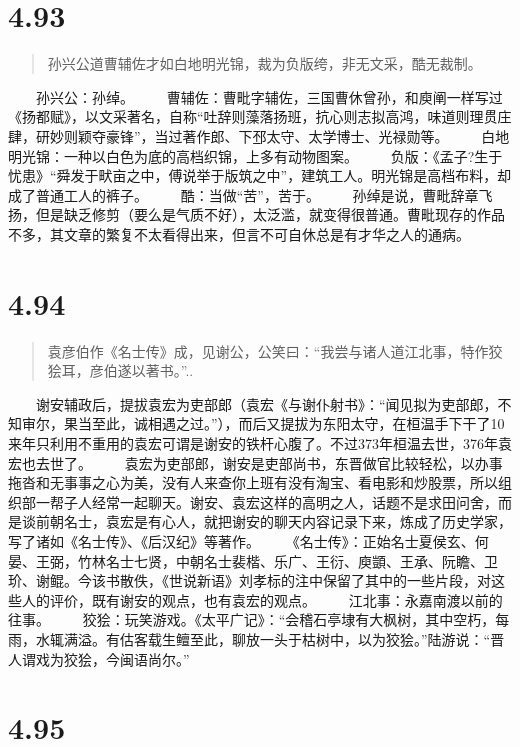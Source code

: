 \documentclass[]{book}
\begin{document}
\section{4.93}\label{section-269}

\begin{quote}
孙兴公道曹辅佐才如白地明光锦，裁为负版绔，非无文采，酷无裁制。
\end{quote}

　　孙兴公：孙绰。
　　曹辅佐：曹毗字辅佐，三国曹休曾孙，和庾阐一样写过《扬都赋》，以文采著名，自称``吐辞则藻落扬班，抗心则志拟高鸿，味道则理贯庄肆，研妙则颖夺豪锋''，当过著作郎、下邳太守、太学博士、光禄勋等。
　　白地明光锦：一种以白色为底的高档织锦，上多有动物图案。
　　负版：《孟子?生于忧患》``舜发于畎亩之中，傅说举于版筑之中''，建筑工人。明光锦是高档布料，却成了普通工人的裤子。
　　酷：当做``苦''，苦于。
　　孙绰是说，曹毗辞章飞扬，但是缺乏修剪（要么是气质不好），太泛滥，就变得很普通。曹毗现存的作品不多，其文章的繁复不太看得出来，但言不可自休总是有才华之人的通病。

\section{4.94}\label{section-270}

\begin{quote}
袁彦伯作《名士传》成，见谢公，公笑曰：``我尝与诸人道江北事，特作狡狯耳，彦伯遂以著书。''..
\end{quote}

　　谢安辅政后，提拔袁宏为吏部郎（袁宏《与谢仆射书》：``闻见拟为吏部郎，不知审尔，果当至此，诚相遇之过。''），而后又提拔为东阳太守，在桓温手下干了10来年只利用不重用的袁宏可谓是谢安的铁杆心腹了。不过373年桓温去世，376年袁宏也去世了。
　　袁宏为吏部郎，谢安是吏部尚书，东晋做官比较轻松，以办事拖沓和无事事之心为美，没有人来查你上班有没有淘宝、看电影和炒股票，所以组织部一帮子人经常一起聊天。谢安、袁宏这样的高明之人，话题不是求田问舍，而是谈前朝名士，袁宏是有心人，就把谢安的聊天内容记录下来，炼成了历史学家，写了诸如《名士传》、《后汉纪》等著作。
　　《名士传》：正始名士夏侯玄、何晏、王弼，竹林名士七贤，中朝名士裴楷、乐广、王衍、庾顗、王承、阮瞻、卫玠、谢鲲。今该书散佚，《世说新语》刘孝标的注中保留了其中的一些片段，对这些人的评价，既有谢安的观点，也有袁宏的观点。
　　江北事：永嘉南渡以前的往事。
　　狡狯：玩笑游戏。《太平广记》：``会稽石亭埭有大枫树，其中空朽，每雨，水辄满溢。有估客载生鳣至此，聊放一头于枯树中，以为狡狯。''陆游说：``晋人谓戏为狡狯，今闽语尚尔。''

\section{4.95}\label{section-271}
\end{document}

